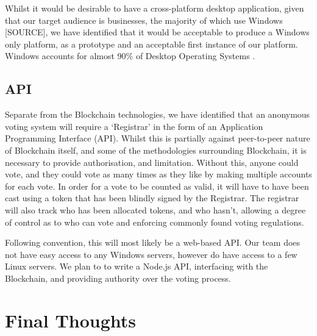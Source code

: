 \documentclass{article}
\begin{document}
\par

Whilst it would be desirable to have a cross-platform desktop application, given that our target audience is businesses, the majority of which use Windows [SOURCE], we have identified that it would be acceptable to produce a Windows only platform, as a prototype and an acceptable first instance of our platform. Windows accounts for almost 90\% of Desktop Operating Systems \parencite{operatingsystemstats}.

\subsection{API}

Separate from the Blockchain technologies, we have identified that an anonymous voting system will require a `Registrar' in the form of an Application Programming Interface (API). Whilst this is partially against peer-to-peer nature of Blockchain itself, and some of the methodologies surrounding Blockchain, it is necessary to provide authorisation, and limitation. Without this, anyone could vote, and they could vote as many times as they like by making multiple accounts for each vote. In order for a vote to be counted as valid, it will have to have been cast using a token that has been blindly signed by the Registrar. The registrar will also track who has been allocated tokens, and who hasn't, allowing a degree of control as to who can vote and enforcing commonly found voting regulations.

\par

Following convention, this will most likely be a web-based API. Our team does not have easy access to any Windows servers, however do have access to a few Linux servers. We plan to to write a Node.js API, interfacing with the Blockchain, and providing authority over the voting process.

\section{Final Thoughts}
\newpage
\printbibliography[heading=bibintoc]
\end{document}
